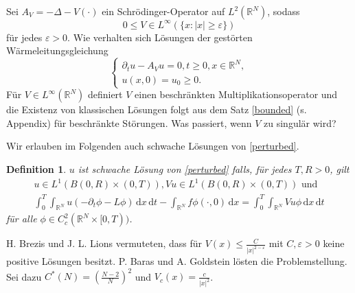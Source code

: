 \documentclass[11pt]{article}
\newtheorem{df}[thm]{Definition}
\theoremstyle{break}
\begin{document}
Sei $A_V= -\Delta - V(\cdot)$ ein Schr\"odinger-Operator auf $L^2(\mathbb R^N)$, sodass
\begin{equation}
0\le V\in L^\infty(\{x:|x|\ge \varepsilon\})
\end{equation}\label{perturbed}
f\"ur jedes $\varepsilon>0$. Wie verhalten sich L\"osungen der gest\"orten W\"armeleitungsgleichung 
\begin{equation}\label{perturbed}
\begin{cases}
\partial_t u - A_V u =0, t\ge 0, x\in \mathbb R^N,\\
u(x,0)=u_0 \ge 0.
\end{cases}
\end{equation}
F\"ur $V\in L^\infty(\mathbb R^N)$ definiert $V$ einen beschr\"ankten Multiplikationsoperator und die Existenz von klassischen L\"osungen folgt aus dem Satz \ref{bounded} (s. Appendix) f\"ur beschr\"ankte St\"orungen. %
Was passiert, wenn $V$ zu singul\"ar wird?

Wir erlauben im Folgenden auch schwache L\"osungen von \eqref{perturbed}. \vspace{.25cm}
\begin{df}
$u$ ist schwache L\"osung von \eqref{perturbed} falls, f\"ur jedes $T, R>0$, gilt
\begin{gather}\label{weak}
u\in L^1(B(0,R) \times (0,T)), Vu \in L^1(B(0,R)\times (0,T)) \text{ und }\\
\int_0^T \int_{\mathbb R^N} u (-\partial_t \phi - L\phi) \, \mathrm dx \, \mathrm dt - \int_{\mathbb R^N} f \phi(\cdot, 0) \, \mathrm dx = \int_0^T \int_{\mathbb R^N} V u \phi \, \mathrm dx \, \mathrm dt
\end{gather}
f\"ur alle $\phi \in C_c^2(\mathbb R^N\times [0,T))$.
\end{df}

H. Brezis und J. L. Lions vermuteten, dass f\"ur $V(x) \le \frac{C}{|x|^{2-\varepsilon}}$ mit $C, \varepsilon>0$ keine positive L\"osungen besitzt. P. Baras und A. Goldstein l\"osten die Problemstellung.  Sei dazu $C^*(N)=( \tfrac{N-2}{N} )^2$ und $V_c(x) = \frac{c}{|x|^2}$. \vspace{.25cm}
\end{document}
